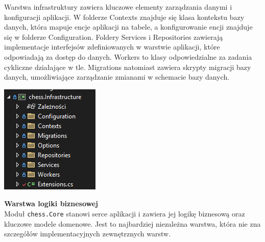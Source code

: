 \documentclass[12pt,a4paper]{article}
\begin{document}
\vspace{0.5cm}
\begin{minipage}[t]{0.45\textwidth}
    \vspace{0pt}
    \justifying 
    \noindent
    Warstwa infrastruktury zawiera kluczowe elementy zarządzania danymi i konfiguracji aplikacji. W folderze Contexts znajduje się klasa kontekstu bazy danych, która mapuje encje aplikacji na tabele, a konfigurowanie encji znajduje się w folderze Configuration. Foldery Services i Repositories zawierają implementacje interfejsów zdefiniowanych w warstwie aplikacji, które odpowiadają za dostęp do danych. Workers to klasy odpowiedzialne za zadania cykliczne działające w tle. Migrations natomiast zawiera skrypty migracji bazy danych, umożliwiające zarządzanie zmianami w schemacie bazy danych.
\end{minipage}
\hfill
\begin{minipage}[t]{0.45\textwidth}
    \vspace{0pt}
    \centering
    \includegraphics[width=\linewidth]{images/struktura_back_infrastructure.png} 
\end{minipage}
\vspace{0.5cm}

\noindent \textbf{Warstwa logiki biznesowej}\\
Moduł \texttt{chess.Core} stanowi serce aplikacji i zawiera jej logikę biznesową oraz kluczowe modele domenowe. Jest to najbardziej niezależna warstwa, która nie zna szczegółów implementacyjnych zewnętrznych warstw.
\end{document}
